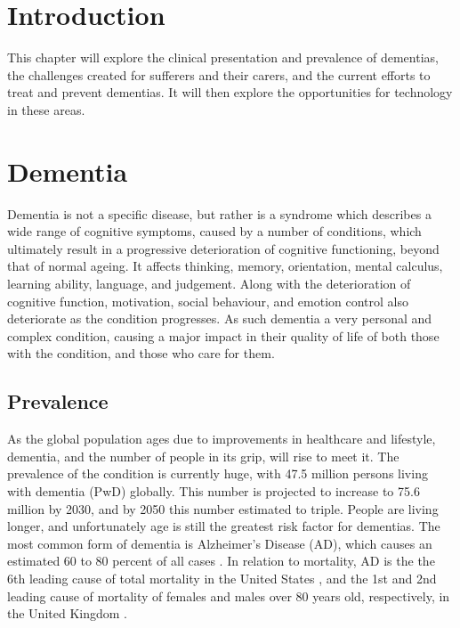  \label{chapter: lit-review}

\section{Introduction}
This chapter will explore the clinical presentation and prevalence of dementias, the challenges created for sufferers and their carers, and the current efforts to treat and prevent dementias. It will then explore the opportunities for technology in these areas.

\section{Dementia}
Dementia is not a specific disease, but rather is a syndrome which describes a wide range of cognitive symptoms, caused by a number of conditions, which ultimately result in a progressive deterioration of cognitive functioning, beyond that of normal ageing. It affects thinking, memory, orientation, mental calculus, learning ability, language, and judgement. Along with the deterioration of cognitive function, motivation, social behaviour, and emotion control also deteriorate as the condition progresses.
As such dementia a very personal and complex condition, causing a major impact in their quality of life of both those with the condition, and those who care for them.

\subsection{Prevalence}
As the global population ages due to improvements in healthcare and lifestyle, dementia, and the number of people in its grip, will rise to meet it.
The prevalence of the condition is currently huge, with 47.5 million persons living with dementia (PwD) globally. This number is projected to increase to 75.6 million by 2030, and by 2050 this number estimated to triple. People are living longer, and unfortunately age is still the greatest risk factor for dementias. The most common form of dementia is Alzheimer's Disease (AD), which causes an estimated 60 to 80 percent of all cases \cite{2015AlzheimersDiseaseFactsFigures}. In relation to mortality, AD is the the 6th leading cause of total mortality in the United States \cite{NationalCenterforHealthStatistics2014}, and the 1st and 2nd leading cause of mortality of females and males over 80 years old, respectively, in the United Kingdom \cite{OfficeforNationalStatistics2014}.

